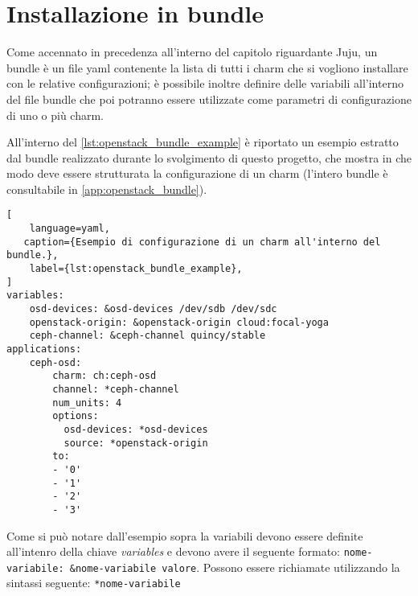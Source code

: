 \section{Installazione in bundle}\label{sec:openstack_installazione_bundle}

Come accennato in precedenza all'interno del capitolo riguardante Juju, un bundle è un file yaml contenente la lista di tutti i charm che si vogliono installare con le relative configurazioni; è possibile inoltre definire delle variabili all'interno del file bundle che poi potranno essere utilizzate come parametri di configurazione di uno o più charm.

All'interno del \cref{lst:openstack_bundle_example} è riportato un esempio estratto dal bundle realizzato durante lo svolgimento di questo progetto, che mostra in che modo deve essere strutturata la configurazione di un charm (l'intero bundle è consultabile in \cref{app:openstack_bundle}).

\begin{lstlisting}[
    language=yaml, 
   caption={Esempio di configurazione di un charm all'interno del bundle.},
    label={lst:openstack_bundle_example},
]
variables:
    osd-devices: &osd-devices /dev/sdb /dev/sdc
    openstack-origin: &openstack-origin cloud:focal-yoga
    ceph-channel: &ceph-channel quincy/stable
applications:
    ceph-osd:
        charm: ch:ceph-osd
        channel: *ceph-channel
        num_units: 4
        options:
          osd-devices: *osd-devices
          source: *openstack-origin
        to:
        - '0'
        - '1'
        - '2'
        - '3'

\end{lstlisting}

Come si può notare dall'esempio sopra la variabili devono essere definite all'intenro della chiave \emph{variables} e devono avere il seguente formato:\newline
\verb|nome-variabile: &nome-variabile valore|.
Possono essere richiamate utilizzando la sintassi seguente: \verb|*nome-variabile|

